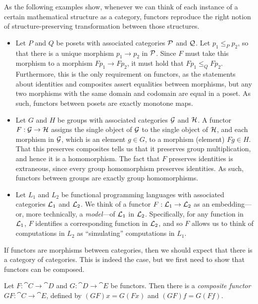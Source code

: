 \begin{ex}
  As the following examples show, whenever we can think of each instance of a
  certain mathematical structure as a category, functors reproduce the right
  notion of structure-preserving transformation between those structures.
  \begin{itemize}
    \item Let $P$ and $Q$ be posets with associated categories $\mathcal{P}$ and $\mathcal{Q}$. Let
      $p_1\leq_P p_2$, so that there is a unique morphism $p_1\to p_2$ in $\mathcal{P}$. Since
      $F$ must take this morphism to a morphism $Fp_1\to Fp_2$, it must hold that
      $Fp_1\leq_Q Fp_2$. Furthermore, this is the only requirement on functors, as
      the statements about identities and composites assert equalities between
      morphisms, but any two morphisms with the same domain and codomain are equal
      in a poset. As such, functors between posets are exactly monotone maps.
    \item Let $G$ and $H$ be groups with associated categories $\mathcal{G}$ and
      $\mathcal{H}$. A functor $F: \mathcal{G}\to\mathcal{H}$ assigns the single object of $\mathcal{G}$ to the
      single object of $\mathcal{H}$, and each morphism in $\mathcal{G}$, which is an element $g\in
      G$, to a morphism (element) $Fg\in H$. That this preserves composites tells us
      that it preserves group multiplication, and hence it is a homomorphism. The
      fact that $F$ preserves identities is extraneous, since every group
      homomorphism preserves identities. As such, functors between groups are exactly
      group homomorphisms.
    \item Let $L_1$ and $L_2$ be functional programming languages with associated
      categories $\mathcal{L}_1$ and $\mathcal{L}_2$. We think of a functor $F: \mathcal{L}_1\to\mathcal{L}_2$ as an
      embedding---or, more technically, a \emph{model}---of $\mathcal{L}_1$ in $\mathcal{L}_2$.
      Specifically, for any function in $\mathcal{L}_1$, $F$ identifies a corresponding
      function in $\mathcal{L}_2$, and so $F$ allows us to think of computations in $L_2$ as
      ``simulating'' computations in $L_1$.
  \end{itemize}
\end{ex}

If functors are morphisms between categories, then we should expect that there
is a category of categories. This is indeed the case, but we first need to show
that functors can be composed.

\begin{prop}
  Let $F: \cat{C}\to\cat{D}$ and $G: \cat{D}\to\cat{E}$ be functors. Then there
  is a \emph{composite functor} $GF: \cat{C}\to\cat{E}$, defined by $(GF)x =
  G(Fx)$ and $(GF)f = G(Ff)$.
\end{prop}


